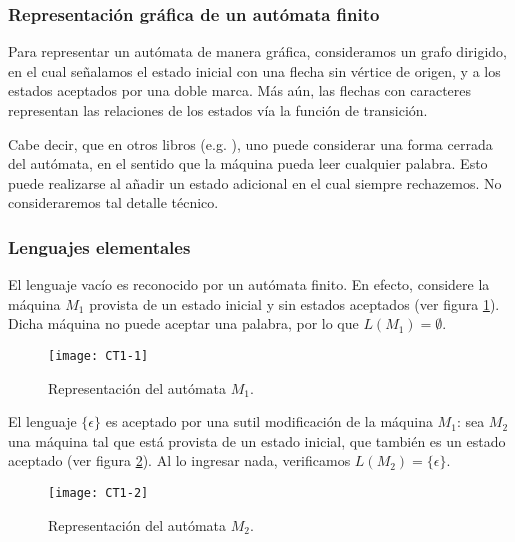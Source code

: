 \subsubsection{Representaci\'on gr\'afica de un aut\'omata finito}

Para representar un aut\'omata de manera gr\'afica, consideramos un grafo dirigido, en el cual se\~nalamos el estado inicial con una flecha sin v\'ertice de origen, y a los estados aceptados por una doble marca. M\'as a\'un, las flechas con caracteres representan las relaciones de los estados v\'ia la funci\'on de transici\'on.

Cabe decir, que en otros libros (e.g. \cite{B:Bro1989} ), uno puede considerar una forma cerrada del aut\'omata, en el sentido que la m\'aquina pueda leer cualquier palabra. Esto puede realizarse al a\~nadir un estado adicional en el cual siempre rechazemos. No consideraremos tal detalle t\'ecnico.

\subsubsection{Lenguajes elementales}

\begin{ejemplo}
    El lenguaje vac\'io es reconocido por un aut\'omata finito.
    En efecto, considere la m\'aquina \(M_1\) provista de un estado inicial y sin  estados aceptados (ver figura \ref{CT1-1}).
    Dicha m\'aquina no puede aceptar una palabra, por lo que \(L(M_1)=\emptyset.\)

    \begin{figure}[h!b]
        \centering
		\texttt{[image: CT1-1]}
		\caption{Representaci\'on del aut\'omata \(M_1.\)}\label{CT1-1}
    \end{figure}
\end{ejemplo}

\begin{ejemplo}
    El lenguaje \(\{\epsilon\}\) es aceptado por una sutil modificaci\'on de la m\'aquina \(M_1\): sea \(M_2\) una m\'aquina tal que est\'a provista de un estado inicial, que tambi\'en es un estado aceptado (ver figura \ref{CT1-2}).
    Al lo ingresar nada, verificamos \(L(M_2)=\{\epsilon\}.\)

    \begin{figure}[h!b]
        \centering
		\texttt{[image: CT1-2]}
		\caption{Representaci\'on del aut\'omata \(M_2.\)}\label{CT1-2}
    \end{figure}
\end{ejemplo}

